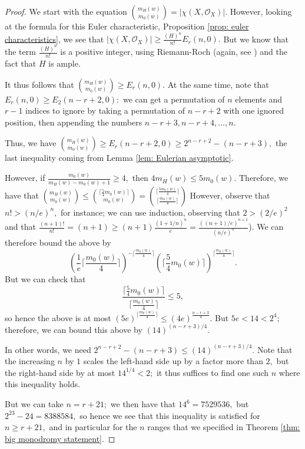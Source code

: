 \documentclass{article}
\theoremstyle{definition}
\theoremstyle{remark}
\begin{document}
\begin{proof}
We start with the equation $\binom{m_H(w)}{m_0(w)} = |\chi(X, \mathcal{O}_X)|.$ However, looking at the formula for this Euler characteristic, Proposition \ref{prop: euler characteristics}, we see that $|\chi(X, \mathcal{O}_X)| \geq \frac{(H)^n}{n!}E_r(n, 0).$ But we know that the term $\frac{(H)^n}{n!}$ is a positive integer, using Riemann-Roch (again, see \cite[\S 16]{mumford}) and the fact that $H$ is ample. 
\par It thus follows that $\binom{m_H(w)}{m_0(w)} \geq E_r(n, 0).$ At the same time, note that $E_r(n, 0) \geq E_2(n-r + 2, 0):$ we can get a permutation of $n$ elements and $r - 1$ indices to ignore by taking a permutation of $n - r + 2$ with one ignored position, then appending the numbers $n - r + 3, n - r + 4, \ldots, n.$ 
\par Thus, we have $\binom{m_H(w)}{m_0(w)} \geq E_r(n-r+2, 0) \geq 2^{n-r+2} - (n-r + 3),$ the last inequality coming from Lemma \ref{lem: Eulerian asymptotic}.
\par However, if $\frac{m_0(w)}{m_H(w) - m_0(w) + 1} \geq 4,$ then $4m_H(w) \leq 5m_0(w).$ Therefore, we have that $\binom{m_H(w)}{m_0(w)} \leq \binom{\lceil \frac{5}{4}m_0(w) \rceil}{m_0(w)} = \binom{\lceil \frac{5m_0(w)}{4}\rceil}{\lceil \frac{m_0(w)}{4}\rceil}$ However, observe that $n! > (n/e)^n,$ for instance; we can use induction, observing that $2 > (2/e)^2$ and that $\frac{(n+1)!}{n!} = (n+1) \geq (n+1) \frac{(1 + 1/n)^n}{e} = \frac{((n+1)/e)^{n+1}}{(n/e)^n}$). We can therefore bound the above by \[(\frac{1}{e}\lceil \frac{m_0(w)}{4}\rceil)^{-\lceil \frac{m_0(w)}{4}\rceil} (\lceil \frac{5}{4}m_0(w) \rceil)^{\lceil \frac{m_0(w)}{4}\rceil}.\] But we can check that \[\frac{\lceil \frac{5}{4}m_0(w) \rceil}{\lceil \frac{m_0(w)}{4}\rceil} \leq 5,\] so hence the above is at most $(5e)^{\lceil \frac{m_0(w)}{4}\rceil} \leq (4e)^{\frac{n-r+3}{4}}.$ But $5e < 14 < 2^4;$ therefore, we can bound this above by $(14)^{(n-r+3)/4}.$
\par In other words, we need $2^{n-r+2} - (n-r+3) \leq (14)^{(n-r+3)/4}.$ Note that the increasing $n$ by $1$ scales the left-hand side up by a factor more than $2,$ but the right-hand side by at most $14^{1/4} < 2;$ it thus suffices to find one such $n$ where this inequality holds.
\par But we can take $n = r + 21;$ we then have that $14^6 = 7529536,$ but $2^{23} - 24 = 8388584,$ so hence we see that this inequality is satisfied for $n \geq r + 21,$ and in particular for the $n$ ranges that we specified in Theorem \ref{thm: big monodromy statement}.
\end{proof}
\end{document}
